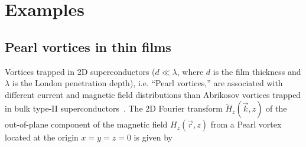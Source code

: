 \documentclass[final,3p,times]{elsarticle}
\newcommand{\inline}[1]{\texttt{#1}\xspace}
\begin{document}

\section{Examples}
\label{section:examples}

\subsection{Pearl vortices in thin films}
\label{section:examples:pearl-vortices}
Vortices trapped in 2D superconductors ($d\ll\lambda$, where $d$ is the film thickness and $\lambda$ is the London penetration depth), i.e. ``Pearl vortices,'' are associated with different current and magnetic field distributions than Abrikosov vortices trapped in bulk type-II superconductors~\cite{Pearl1964-cl}. The 2D Fourier transform $\tilde{H}_z(\vec{k}, z)$ of the out-of-plane component of the magnetic field $H_z(\vec{r}, z)$ from a Pearl vortex located at the origin $x=y=z=0$ is given by
\end{document}
